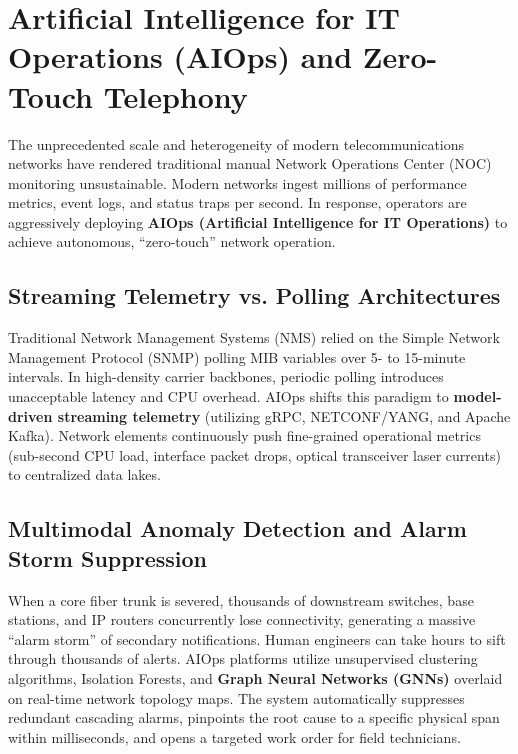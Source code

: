 \documentclass[12pt,a4paper]{report}
\begin{document}
\section{Artificial Intelligence for IT Operations (AIOps) and Zero-Touch Telephony}
The unprecedented scale and heterogeneity of modern telecommunications networks have rendered traditional manual Network Operations Center (NOC) monitoring unsustainable. Modern networks ingest millions of performance metrics, event logs, and status traps per second. In response, operators are aggressively deploying \textbf{AIOps (Artificial Intelligence for IT Operations)} to achieve autonomous, ``zero-touch'' network operation.

\subsection{Streaming Telemetry vs. Polling Architectures}
Traditional Network Management Systems (NMS) relied on the Simple Network Management Protocol (SNMP) polling MIB variables over 5- to 15-minute intervals. In high-density carrier backbones, periodic polling introduces unacceptable latency and CPU overhead. AIOps shifts this paradigm to \textbf{model-driven streaming telemetry} (utilizing gRPC, NETCONF/YANG, and Apache Kafka). Network elements continuously push fine-grained operational metrics (sub-second CPU load, interface packet drops, optical transceiver laser currents) to centralized data lakes.

\subsection{Multimodal Anomaly Detection and Alarm Storm Suppression}
When a core fiber trunk is severed, thousands of downstream switches, base stations, and IP routers concurrently lose connectivity, generating a massive ``alarm storm'' of secondary notifications. Human engineers can take hours to sift through thousands of alerts. AIOps platforms utilize unsupervised clustering algorithms, Isolation Forests, and \textbf{Graph Neural Networks (GNNs)} overlaid on real-time network topology maps. The system automatically suppresses redundant cascading alarms, pinpoints the root cause to a specific physical span within milliseconds, and opens a targeted work order for field technicians.
\end{document}
